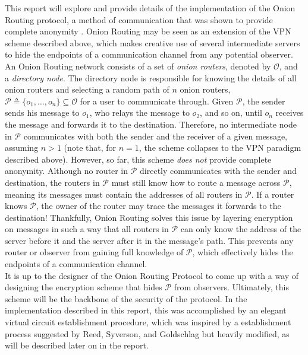 \documentclass[10pt]{report}
\begin{document}
This report will explore and provide details of the implementation of the Onion Routing protocol, a
method of communication that was shown to provide complete anonymity \cite{FormalTreatment}. Onion
Routing may be seen as an extension of the VPN scheme described above, which makes creative use of
several intermediate servers to hide the endpoints of a communication channel from any potential
observer. An Onion Routing network consists of a set of \textit{onion routers}, denoted by
$\mathcal{O}$, and a \textit{directory node}. The directory node is responsible for knowing the
details of all onion routers and selecting a random path of $n$ onion routers,
$\mathcal{P}\triangleq\{o_1,\dots ,o_n\}\subseteq\mathcal{O}$
for a user to communicate through. Given $\mathcal{P}$, the sender sends
his message to $o_1$, who relays the message to $o_2$, and so on, until $o_n$ receives the message
and forwards it to the destination. Therefore, no intermediate node in $\mathcal{P}$ communicates
with both the sender and the receiver of a given message, assuming $n > 1$ (note that, for $n=1$,
the scheme collapses to the VPN paradigm described above). However, so far, this scheme \textit{does
not} provide complete anonymity. Although no router in $\mathcal{P}$ directly communicates with the
sender and destination, the routers in $\mathcal{P}$ must still know how to route a message across
$\mathcal{P}$, meaning its messages must contain the addresses of all routers in $\mathcal{P}$. If a
router knows $\mathcal{P}$, the owner of the router may trace the messages it
forwards to the destination! Thankfully, Onion Routing solves this issue by layering encryption on
messages in such a way that all routers in $\mathcal{P}$ can only know the address of the server
before it and the server after it in the message's path. This prevents any router or observer from
gaining full knowledge of $\mathcal{P}$, which effectively hides the endpoints of a communication
channel.\\

It is up to the designer of the Onion Routing Protocol to come up with a way of designing the
encryption scheme that hides $\mathcal{P}$ from observers. Ultimately, this scheme will be the
backbone of the security of the protocol. In the implementation described in this report, this was
accomplished by an elegant virtual circuit establishment procedure, which was inspired by a
establishment process suggested by Reed, Syverson, and Goldschlag \cite{OnionRoutingPatent} but
heavily modified, as will be described later on in the report.\\
\end{document}

